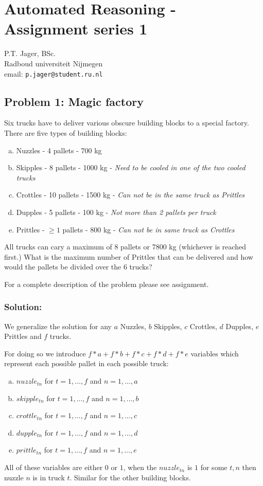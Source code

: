 \documentclass[12pt]{article}
\begin{document}
\section*{Automated Reasoning - Assignment series 1 }

\begin{center}
P.T. Jager, BSc. \\
Radboud universiteit Nijmegen\\
email: {\tt p.jager@student.ru.nl}
\end{center}

\subsection*{Problem 1: Magic factory}

Six trucks have to deliver various obscure building blocks to a special 
factory. There are five types of building blocks:
\begin{enumerate}[(a)]
	\item Nuzzles - 4 pallets - 700 kg 
	\item Skipples - 8 pallets - 1000 kg - \textit{Need to be cooled in
		one of the two cooled trucks}
	\item Crottles - 10 pallets - 1500 kg - \textit{Can not be in the same truck
		as Prittles}
	\item Dupples - 5 pallets - 100 kg - \textit{Not more than 2 pallets per
		truck}
	\item Prittles - $\geq 1$ pallets - 800 kg - \textit{Can not be in same 
		truck as Crottles}
\end{enumerate}
All trucks can cary a maximum of 8 pallets or 7800 kg (whichever is reached 
first.)
What is the maximum number of Prittles that can be delivered and how would the
pallets be divided over the 6 trucks?

For a complete description of the problem please see assignment. 

\subsubsection*{Solution:}

We generalize the solution for any $a$ Nuzzles, $b$ Skipples, $c$ Crottles, 
$d$ Dupples, $e$ Prittles and $f$ trucks.

For doing so we introduce $f*a + f*b + f*c + f*d + f*e$ variables which 
represent each possible pallet in each possible truck: 
\begin{enumerate}[(a)]
	\item $nuzzle_{tn}$ for $t=1,\ldots,f$ and $n=1,\ldots,a$
	\item $skipple_{tn}$ for $t=1,\ldots,f$ and $n=1,\ldots,b$
	\item $crottle_{tn}$ for $t=1,\ldots,f$ and $n=1,\ldots,c$
	\item $dupple_{tn}$ for $t=1,\ldots,f$ and $n=1,\ldots,d$
	\item $prittle_{tn}$ for $t=1,\ldots,f$ and $n=1,\ldots,e$
\end{enumerate}
All of these variables are either $0$ or $1$, when the $nuzzle_{tn}$ 
is $1$ for some $t,n$ then nuzzle $n$ is in truck $t$. Similar for the other 
building blocks.
\end{document}
